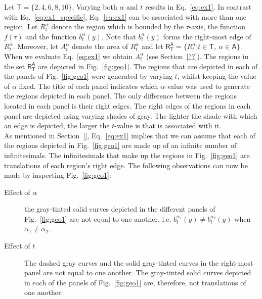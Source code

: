 \documentclass[twoside,reqno,11pt]{fcaa-var} %
\begin{document}
\noindent
Let $\mathsf{T}=\{2,4,6,8,10\}$. Varying both $\alpha$ and $t$ results in Eq.~\eqref{eq:ex1}. In contrast with Eq.~\eqref{eq:ex1_specific}, Eq.~\eqref{eq:ex1} can be associated with more than one region. 
Let $R_{t}^{\alpha}$ denote the region which is bounded by the $\tau$-axis, the function $f(\tau)$ and the function $b_{t}^{\alpha}(y)$. Note that $b_{t}^{\alpha}(y)$ forms the 
right-most edge of $R_{t}^{\alpha}$. Moreover, let $A_{t}^{\alpha}$ denote the area of $R_{t}^{\alpha}$ and let $\mathsf{R}_{\mathsf{T}}^{\mathsf{A}}=\{R_t^{\alpha}|t\in\mathsf{T},~\alpha\in\mathsf{A}\}$. When we evaluate Eq.~\eqref{eq:ex1} we obtain $A_{t}^{\alpha}$ (see Section~\ref{??}). The regions in the set $\mathsf{R}_{\mathsf{T}}^{\mathsf{A}}$ are depicted in Fig.~\ref{fig:geo1}. The regions that are depicted in each of the panels of Fig.~\ref{fig:geo1} were generated by varying $t$, whilst keeping the value of $\alpha$ fixed. The title of each panel indicates which $\alpha$-value was used to generate the regions depicted in each panel. The only difference between the regions located in each 
panel is their right edges. The right edges of the regions in each panel are depicted using varying shades of gray. The lighter the shade with which an edge is depicted, 
the larger the $t$-value is that is associated with it.\\

\noindent
As mentioned in Section~\ref{}, Eq.~\eqref{eq:ex1} implies that we can assume that each of the regions depicted in Fig.~\ref{fig:geo1} are made up of an infinite number of infinitesimals. The infinitesimals that make up the regions in Fig.~\ref{fig:geo1} are translations of each region's right edge. The following observations can now be made by inspecting Fig.~\ref{fig:geo1}: 
\begin{description}
 \item[Effect of $\alpha$] the gray-tinted solid curves depicted in the different panels of Fig.~\ref{fig:geo1} are not equal to one another, i.e. $b_{t}^{\alpha_1}(y)\neq b_{t}^{\alpha_2}(y)$ when $\alpha_1\neq\alpha_2$. 
 \item[Effect of $t$] The dashed gray curves and the solid gray-tinted curves in the right-most panel are not equal to one another. The gray-tinted solid curves depicted in each of the panels of Fig.~\ref{fig:geo1} are, therefore, not translations of one another.
\end{description}
\end{document}
